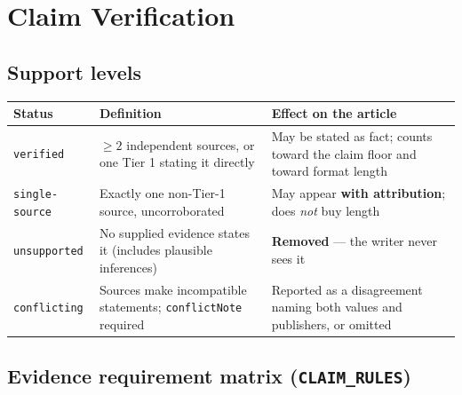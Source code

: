\documentclass[10pt,a4paper]{article}
\newcommand{\cd}[1]{\texttt{\footnotesize\hyphenpenalty=0\exhyphenpenalty=0\relax #1}}
\newcommand{\us}{\_\discretionary{}{}{}}
\begin{document}
\section{Claim Verification}

\subsection{Support levels}

\begin{center}\footnotesize
\begin{tabularx}{\textwidth}{@{}l >{\RaggedRight}X >{\RaggedRight}p{5.1cm}@{}}
\toprule
\textbf{Status} & \textbf{Definition} & \textbf{Effect on the article} \\
\midrule
\cd{verified} & $\geq 2$ independent sources, or one Tier 1 stating it directly & May be stated as fact; counts toward the claim floor and toward format length \\
\cd{single-source} & Exactly one non-Tier-1 source, uncorroborated & May appear \textbf{with attribution}; does \emph{not} buy length \\
\cd{unsupported} & No supplied evidence states it (includes plausible inferences) & \textbf{Removed} --- the writer never sees it \\
\cd{conflicting} & Sources make incompatible statements; \cd{conflictNote} required & Reported as a disagreement naming both values and publishers, or omitted \\
\bottomrule
\end{tabularx}
\end{center}

\subsection{Evidence requirement matrix (\cd{CLAIM\us RULES})}
\end{document}
